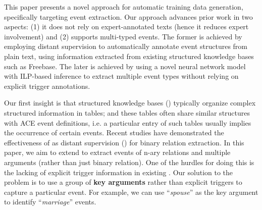

This paper presents a novel approach for automatic training data generation, specifically targeting event extraction. Our approach advances prior work\FIXME{\cite{}} in two aspects: (1) it does not rely on expert-annotated texts (hence it reduces expert involvement) and (2) supports multi-typed events. The former is achieved by employing distant supervision to automatically annotate event structures from plain text, using information extracted from existing structured knowledge bases such as Freebase. The later is achieved by using a novel neural network model with ILP-based inference to extract multiple event types without relying on explicit trigger annotations.


Our first insight is that structured knowledge bases (\KB) typically organize
complex structured information in tables; and these tables often share similar structures with ACE event definitions, i.e. a particular entry of such tables usually implies the occurrence of certain events.
Recent studies \cite{mintz2009distant,zeng2015distant} have demonstrated the effectiveness of \KB as distant supervision (\DS) for binary relation extraction. In this paper, we aim to extend \DS to extract events of n-ary relations and multiple arguments (rather than just binary
relation). One of the hurdles for doing this is the lacking of explicit trigger information in existing \KB. 
Our solution to the problem is to use a group of \textbf{key arguments} rather than explicit triggers to capture a particular event. For example, we can use ``\emph{spouse}'' as the key argument to identify ``\emph{marriage}'' events.



